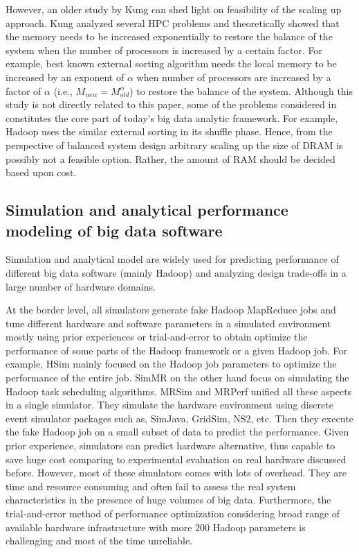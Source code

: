 \documentclass[journal]{IEEEtran}
\begin{document}
However, an older study by Kung \cite{Balance:kung1986memory} can shed light on feasibility of the scaling up approach. Kung analyzed several HPC problems and theoretically showed that the memory needs to be increased exponentially to restore the balance of the system when the number of processors is increased by a certain factor. For example, best known external sorting algorithm needs the local memory to be increased by an exponent of $\alpha$ when number of processors are increased by a factor of  $\alpha$ (i.e., $M_{new} = M_{old}^{\alpha}$) to restore the balance of the system. Although this study is not directly related to this paper, some of the problems considered in \cite{Balance:kung1986memory} constitutes the core part of today's big data analytic framework. For example, Hadoop uses the similar external sorting in its shuffle phase. Hence, from the perspective of balanced system design arbitrary scaling up the size of DRAM is possibly not a feasible option. Rather, the amount of RAM should be decided based upon cost.

\subsection{Simulation and analytical performance modeling of big data software}
Simulation and analytical model are widely used for predicting performance of different big data software (mainly Hadoop) and analyzing design trade-offs in a large number of hardware domains. 

At the border level, all simulators generate fake Hadoop MapReduce jobs and tune different hardware and software parameters in a simulated environment mostly using prior experiences or trial-and-error to obtain optimize the performance of some parts of the Hadoop framework or a given Hadoop job. For example, HSim \cite{Simulator:liu2013hsim} mainly focused on the Hadoop job parameters to optimize the performance of the entire job. SimMR \cite{Simulator:verma2011play} on the other hand focus on simulating the Hadoop task scheduling algorithms. MRSim\cite{Simulator:hammoud2010mrsim} and MRPerf \cite{Simulator:wang2009simulation} unified all these aspects in a single simulator. They simulate the hardware environment using discrete event simulator packages such as,  SimJava, GridSim, NS2, etc. Then  they execute the fake Hadoop job on a small subset of data to predict the performance. Given prior experience, simulators can predict hardware alternative, thus capable to save huge cost comparing to experimental evaluation on real hardware discussed before. However, most of these simulators comes with lots of overhead. They are time and resource consuming and often fail to assess the real system characteristics in the presence of huge volumes of big data. Furthermore, the trial-and-error method of performance optimization considering broad range of available hardware infrastructure with more $200$ Hadoop parameters is challenging and most of the time unreliable.
\end{document}
